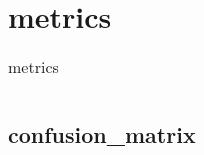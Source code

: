 \chapter{metrics\label{metrics}}
\begin{table}
    \centering
    \caption{metrics}
    \begin{tabular}{l}
        \hline
        \nameref{confusionmatrix} \\
        \hline
    \end{tabular}
\end{table}
\section{confusion\_matrix\label{confusionmatrix}}